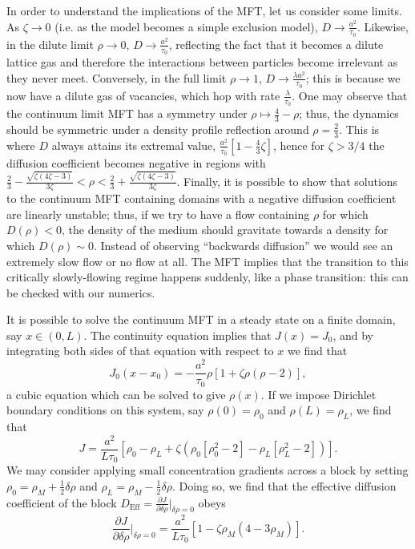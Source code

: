 \documentclass[
reprint,
 amsmath,amssymb,
 aps,
 prl,
]{revtex4-1}
\newcommand{\partDeriv}[2]{\frac{\partial #1}{\partial #2}}
\begin{document}
In order to understand the implications of the MFT, let us consider some limits. As $\zeta \rightarrow 0$ (i.e. as the model becomes a simple exclusion model), $D \rightarrow \frac{a^2}{\tau_0}$. Likewise, in the
dilute limit $\rho \rightarrow 0$, $D \rightarrow \frac{ a^2}{\tau_0}$, reflecting the fact that it becomes a dilute lattice gas and therefore the interactions between particles become irrelevant as they never meet.
Conversely, in the full limit $\rho \rightarrow 1$, $D \rightarrow \frac{\lambda a^2}{\tau_0}$; this is because we now have a dilute gas of vacancies, which hop with rate $\frac{\lambda}{\tau_0}$.
One may observe that the continuum limit MFT has a symmetry under $\rho \mapsto \frac{4}{3} - \rho$; thus, the dynamics should be symmetric under a density profile reflection around $\rho = \frac{2}{3}$. This is where $D$ always
attains its extremal value, $ \frac{a^2}{\tau_0}\left[1 - \frac{4}{3}\zeta\right]$, hence for $\zeta>3/4$ the diffusion coefficient becomes negative in regions with
$\frac{2}{3} - \frac{\sqrt{\zeta\left(4\zeta - 3\right)}}{3\zeta} < \rho < \frac{2}{3} + \frac{\sqrt{\zeta\left(4\zeta - 3\right)}}{3\zeta}$.
Finally, it is possible to show that solutions to the continuum MFT containing domains with a negative diffusion coefficient are linearly unstable; thus, if we try to have a flow containing $\rho$ for which $D(\rho)<0$,
the density of the medium should gravitate towards a density for which $D(\rho)\sim 0$. Instead of observing ``backwards diffusion'' we would see an extremely slow flow or no flow at all. The MFT implies that the transition
to this critically slowly-flowing regime happens suddenly, like a phase transition: this can be checked with our numerics.

It is possible to solve the continuum MFT in a steady state on a finite domain, say $x\in(0, L)$. The continuity equation implies that $J(x)=J_0$, and by integrating both sides of that equation with respect to $x$ we find that
\begin{equation}
 J_0 (x-x_0) = -\frac{a^2}{\tau_0} \rho \left[1+\zeta \rho\left(\rho-2\right)\right],
\end{equation}
a cubic equation which can be solved to give $\rho(x)$. If we impose Dirichlet boundary conditions on this system, say $\rho(0)=\rho_0$ and $\rho(L)=\rho_L$, we find that
\begin{equation}
 J = \frac{a^2}{L \tau_0} \left[ \rho_0 - \rho_L + \zeta \left( \rho_0\left[\rho_0^2-2\right] - \rho_L\left[\rho_L^2-2\right] \right) \right].
\end{equation}
We may consider applying small concentration gradients across a block by setting $\rho_0 = \rho_M + \frac{1}{2}\delta\rho$ and $\rho_L = \rho_M - \frac{1}{2}\delta\rho$. Doing so, we find that the effective diffusion coefficient of the block
$D_\mathrm{Eff}=\partDeriv{J}{\delta\rho}\big|_{\delta\rho=0}$ obeys
\begin{equation}
\label{eq:MFTflow}
 \partDeriv{J}{\delta\rho}\bigg|_{\delta\rho=0} = \frac{a^2}{L \tau_0} \left[ 1 - \zeta\rho_M(4-3\rho_M) \right].
\end{equation}
\end{document}
